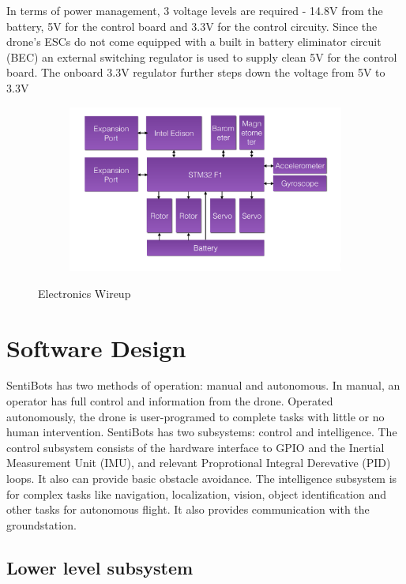 \documentclass[12pt]{article}
\begin{document}
In terms of power management, 3 voltage levels are required - 14.8V from the battery, 5V for the control board and 3.3V for the control circuity. Since the drone’s ESCs do not come equipped with a built in battery eliminator circuit (BEC) an external switching regulator is used to supply clean 5V for the control board. The onboard 3.3V regulator further steps down the voltage from 5V to 3.3V

\begin{figure}[h]
	\centering
	\begin{subfigure}{\textwidth}
		\centering
		\includegraphics[width=\linewidth]{framework.png}
	\end{subfigure}
	\caption{Electronics Wireup}
	\label{fig:electronics}
\end{figure}

\section{Software Design}

SentiBots has two methods of operation: manual and autonomous. In manual, an operator has full control and information from the drone. Operated autonomously, the drone is user-programed to complete tasks with little or no human intervention. SentiBots has two subsystems: control and intelligence. The control subsystem consists of the hardware interface to GPIO and the Inertial Measurement Unit (IMU), and relevant Proprotional Integral Derevative (PID) loops. It also can provide basic obstacle avoidance. The intelligence subsystem is for complex tasks like navigation, localization, vision, object identification and other tasks for autonomous flight. It also provides communication with the groundstation.

\subsection{Lower level subsystem}
\end{document}
